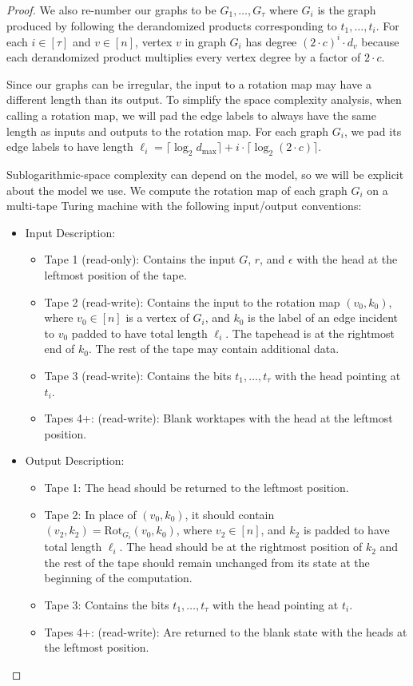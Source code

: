 \documentclass[11pt]{article}
\numberwithin{equation}{section}
\theoremstyle{definition}
\theoremstyle{plain}
\newcommand{\dmax}{d_{\mathrm{max}}}
\numberwithin{myalgctr}{section}
\theoremstyle{named}
\begin{document}
\begin{proof}
We also re-number our graphs to be $G_{1},\ldots, G_{\tau}$ where $G_i$ is the graph produced by following the derandomized products corresponding to $t_1,\ldots, t_i$. For each $i\in[\tau]$ and $v\in[n]$, vertex $v$ in graph $G_i$ has degree $(2\cdot c)^{i}\cdot d_v$ because each derandomized product multiplies every vertex degree by a factor of $2\cdot c$. 

Since our graphs can be irregular, the input to a rotation map may have a different length than its output. To simplify the space complexity analysis, when calling a rotation map, we will pad the edge labels to always have the same length as inputs and outputs to the rotation map. For each graph $G_i$, we pad its edge labels to have length $\ell_i=\lceil{\log_2\dmax}\rceil +i\cdot \lceil{\log_2(2\cdot c)}\rceil$. 

Sublogarithmic-space complexity can depend on the model, so we will be explicit about the model we use. We compute the rotation map of each graph $G_i$ on a multi-tape Turing machine with the following input/output conventions:

\begin{itemize}
\item Input Description:
\begin{itemize}
\item Tape 1 (read-only): Contains the input $G$, $r$, and $\epsilon$ with the head at the leftmost position of the tape.
\item Tape 2 (read-write): Contains the input to the rotation map  $(v_0,k_0)$, where $v_0\in[n]$ is a vertex of $G_i$, and $k_0$ is the label of an edge incident to $v_0$ padded to have total length $\ell_i$. The tapehead is at the rightmost end of $k_0$. The rest of the tape may contain additional data.
\item Tape 3 (read-write): Contains the bits $t_1,\ldots, t_{\tau}$ with the head pointing at $t_i$.
\item Tapes 4+: (read-write): Blank worktapes with the head at the leftmost position.
\end{itemize}

\item Output Description:
\begin{itemize}
\item Tape 1: The head  should be returned to the leftmost position.
\item Tape 2: In place of $(v_0,k_0)$, it should contain $(v_2,k_2)=\mathrm{Rot}_{G_i}(v_0,k_0)$, where $v_2\in[n]$, and $k_2$ is padded to have total length $\ell_i$. The head should be at the rightmost position of $k_2$ and the rest of the tape should remain unchanged from its state at the beginning of the computation.
\item Tape 3: Contains the bits $t_1,\ldots, t_{\tau}$ with the head pointing at $t_i$.
\item Tapes 4+: (read-write): Are returned to the blank state with the heads at the leftmost position.
\end{itemize}
\end{itemize}


\end{proof}
\end{document}
